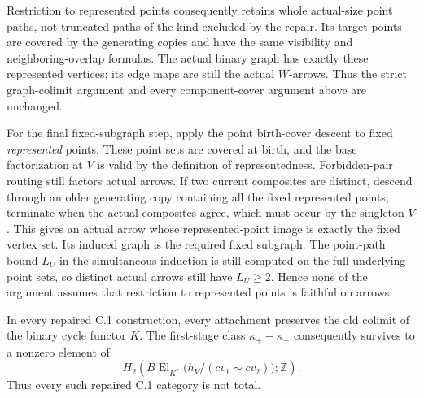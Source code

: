 Restriction to represented points consequently retains whole
actual-size point paths, not truncated paths of the kind excluded
by the repair. Its target points are covered by the generating
copies and have the same visibility and neighboring-overlap
formulas. The actual binary graph has exactly these represented
vertices; its edge maps are still the actual $W$-arrows. Thus the
strict graph-colimit argument and every component-cover argument
above are unchanged.

For the final fixed-subgraph step, apply the point birth-cover
descent to fixed \emph{represented} points. These point sets are
covered at birth, and the base factorization at $V$ is valid by
the definition of representedness. Forbidden-pair routing still
factors actual arrows. If two current composites are distinct,
descend through an older generating copy containing all the
fixed represented points; terminate when the actual composites
agree, which must occur by the singleton $V$. This gives an
actual arrow whose represented-point image is exactly the fixed
vertex set. Its induced graph is the required fixed subgraph.
The point-path bound $L_U$ in the simultaneous induction is still
computed on the full underlying point sets, so distinct actual
arrows still have $L_U\geq2$. Hence none of the argument assumes
that restriction to represented points is faithful on arrows.

\begin{corollary}
\label{C:universal-nontotal}
In every repaired C.1 construction, every attachment preserves
the old colimit of the binary cycle functor $K$. The first-stage
class $\kappa_+-\kappa_-$ consequently survives to a nonzero
element of
\[
 H_2\!\left(B\operatorname{El}_{K^*}
    \bigl(h_V/(cv_1\sim cv_2)\bigr);\mathbb Z\right).
\]
Thus every such repaired C.1 category is not total.
\end{corollary}

